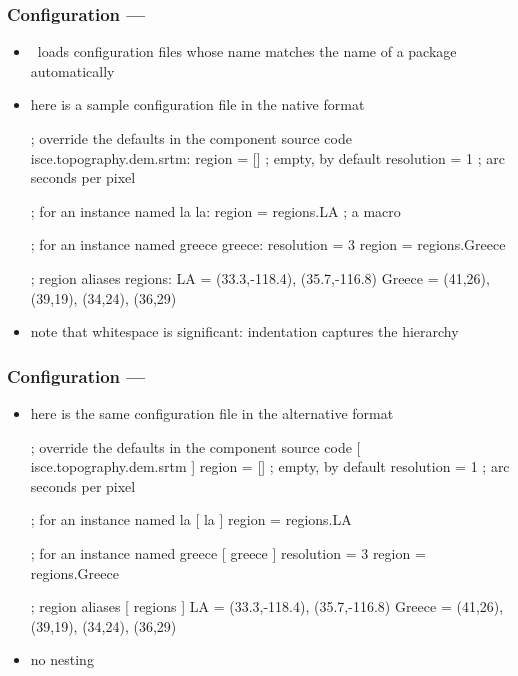 \begin{frame}[fragile]
%
  \frametitle{Configuration --- }
%
  \begin{itemize}
%
    \item \pyre\ loads configuration files whose name matches the name of a package automatically
%
    \item here is a sample configuration file in the native  format
%
      \begin{ipfg}[gobble=6]{}
        ; override the defaults in the component source code
        isce.topography.dem.srtm:
            region = [] ; empty, by default
            resolution = 1 ; arc seconds per pixel

        ; for an instance named la
        la:
            region = {regions.LA} ; a macro

        ; for an instance named greece
        greece:
            resolution = 3
            region = {regions.Greece}

        ; region aliases
        regions:
            LA = (33.3,-118.4), (35.7,-116.8)
            Greece = (41,26), (39,19), (34,24), (36,29)
      \end{ipfg}
%
    \item note that whitespace is significant: indentation captures the hierarchy
%
  \end{itemize}
%
\end{frame}

\begin{frame}[fragile]
%
  \frametitle{Configuration --- }
%
  \begin{itemize}
%
    \item here is the same configuration file in the alternative  format
%
      \begin{icfg}[gobble=6]{}
        ; override the defaults in the component source code
        [ isce.topography.dem.srtm ]
        region = [] ; empty, by default
        resolution = 1 ; arc seconds per pixel

        ; for an instance named la
        [ la ]
        region = {regions.LA}

        ; for an instance named greece
        [ greece ]
        resolution = 3
        region = {regions.Greece}

        ; region aliases
        [ regions ]
        LA = (33.3,-118.4), (35.7,-116.8)
        Greece = (41,26), (39,19), (34,24), (36,29)
      \end{icfg}
%
    \item no nesting
%
  \end{itemize}
%
\end{frame}

